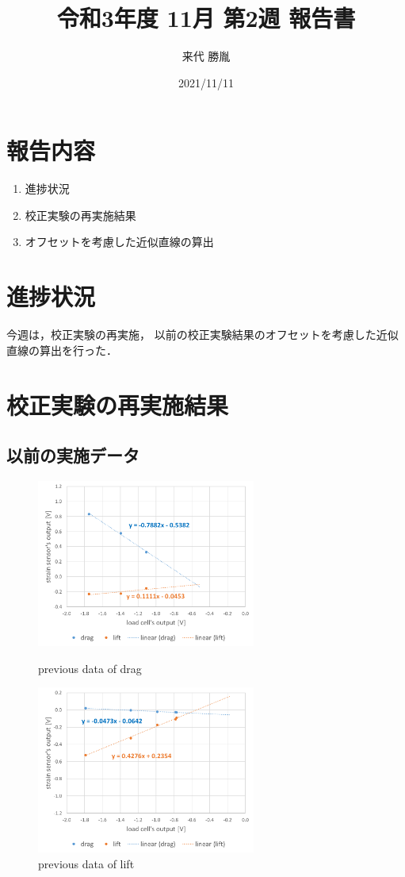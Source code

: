 \documentclass[twocolumn,a4j]{jsarticle}
\author{来代 勝胤}
\title{令和3年度 11月 第2週 報告書}
\date{2021/11/11}
\begin{document}
\columnseprule=0.1mm

\maketitle
\section*{報告内容}
\begin{enumerate}[1.]
    \item 進捗状況
    \item 校正実験の再実施結果
    \item オフセットを考慮した近似直線の算出
\end{enumerate}

\section{進捗状況}
今週は，校正実験の再実施，
以前の校正実験結果のオフセットを考慮した近似直線の算出を行った．

\section{校正実験の再実施結果}
\subsection{以前の実施データ}
\begin{figure}[htbp]
    \footnotesize
    \begin{center}
        \includegraphics[width=72mm]{../images/graph_21119_drag_previous.png}
        \caption{previous data of drag}
        \includegraphics[width=72mm]{../images/graph_21119_lift_previous.png}
        \caption{previous data of lift}
    \end{center}
\end{figure}
\end{document}
